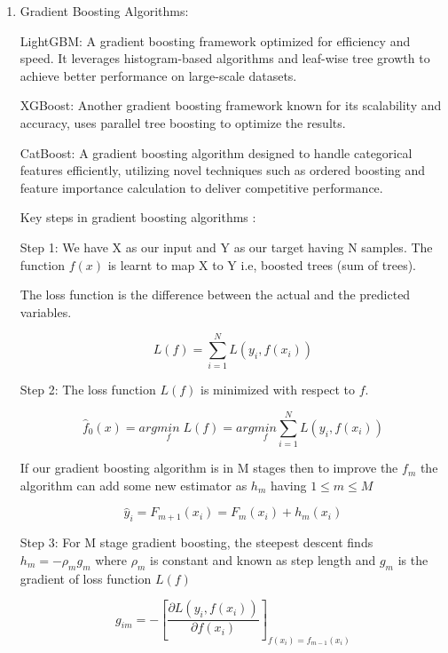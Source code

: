 \documentclass[pdflatex,sn-mathphys-num]{sn-jnl}%
\begin{document}
\begin{enumerate}[label=(\roman*),itemsep=10pt]
\item Gradient Boosting Algorithms:

LightGBM: A gradient boosting framework optimized for efficiency and speed. It leverages histogram-based algorithms and leaf-wise tree growth to achieve better performance on large-scale datasets.

XGBoost: Another gradient boosting framework known for its scalability and accuracy, uses parallel tree boosting to optimize the results.

CatBoost: A gradient boosting algorithm designed to handle categorical features efficiently, utilizing novel techniques such as ordered boosting and feature importance calculation to deliver competitive performance.


Key steps in gradient boosting algorithms \cite{geeksforgeeks2023gradient}:

Step 1:
We have X as our input and Y as our target having N samples. The function $f(x)$ is learnt to map X to Y i.e, boosted trees (sum of trees).

The loss function is the difference between the actual and the predicted variables.

\begin{equation}
L(f)= \sum ^{N}_{i=1}L(y_i,f(x_i))
\end{equation}

Step 2:  The loss function $L(f)$ is minimized with respect to $f$.

\begin{equation}
\hat f_0 (x) = arg\underset{f}{min} \;L(f) = arg\underset{f}{min} \sum ^{N}_{i=1}L(y_i,f(x_i))
\end{equation}

If our gradient boosting algorithm is in M stages then to improve the $f_m$  the algorithm can add some new estimator as $h_m$    having $1\le m \le M $

\begin{equation}
 \hat y_i = F_{m+1}(x_i) = F_m(x_i) + h_m(x_i)
\end{equation}

Step 3: For M stage gradient boosting, the steepest descent finds $h_m = -\rho_m g_m$  where  $\rho _m$  is constant and known as step length and $g_m$  is the gradient of loss function $L(f)$

\begin{equation}
g_{im} =-\left[\frac{\partial L(y_i,f(x_i))}{\partial f(x_i)} \right]_{f(x_i)=f_{m-1}(x_i)}
\end{equation}



\end{enumerate}
\end{document}

